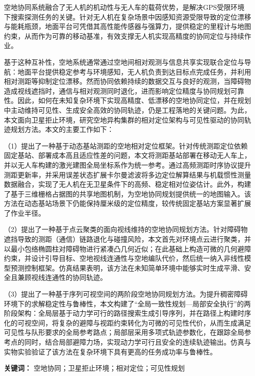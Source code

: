 \cleardoublepage
{}

空地协同系统融合了无人机的机动性与无人车的载荷优势，是解决GPS受限环境下搜索探测任务的关键。针对无人机在复杂场景中因感知资源受限导致的定位漂移与能耗瓶颈，地面平台可凭借其高性能传感器与强算力，提供稳定的里程计与地图约束，从而作为可靠的移动基准，有效支撑无人机实现高精度的协同定位与持续作业。

基于这种互补性，空地系统通常通过空地间相对观测与信息共享实现联合定位与导航：地面平台提供稳定参考与环境感知，无人机负责到达目标点完成任务，并利用相对测距等抑制定位漂移。然而协同依赖持续的数据交互与良好的观测，当障碍物造成视线遮挡时，通信与相对观测同时退化，进而影响定位精度与协同规划可靠性。因此，如何在未知复杂环境下实现高精度、低漂移的空地协同定位，并在规划中主动维持可见性、生成安全高效的协同轨迹，仍是工程落地的关键问题。为此，本文面向卫星拒止环境，研究空地异构集群的相对定位架构与可见性驱动的协同轨迹规划方法。本文的主要工作如下：

（1）提出了一种基于动态基站测距的空地相对定位框架。针对传统测距定位依赖固定基站、部署成本高且适应性差的问题，本文将测距基站部署在移动无人车上，并以无人车构建的激光建图全局坐标系作为统一参考。通过高频测距时序协议提升测距更新率，并采用误差状态扩展卡尔曼滤波将多边定位解算结果与机载惯性测量数据融合，实现了无人机在无卫星条件下的高频、稳定相对位姿估计。此外，构建了基于三维栅格占据图的共享地图机制，为空地协同规划提供统一的地图输入。该方法在动态基站场景下仍能保持厘米级的定位精度，较传统固定基站方案显著扩展了作业半径。

（2）提出了一种基于点云聚类的面向视线维持的空地协同规划方法。针对障碍物遮挡导致的测距（通信）链路退化与碰撞风险，本文首先对环境点云进行聚类，并以最小包络椭圆柱对障碍物进行紧凑凸几何近似；在此基础上构造可微的几何避障约束，并设计引导目标、空地视线连通性与空地编队代价，然后统一纳入非线性模型预测控制框架。仿真结果表明，该方法在未知简单环境中能够实时生成平滑、安全且兼顾视线连通性的协同轨迹。

（3）提出了一种基于序列可视空间的两阶段空地协同规划方法。为提升稠密障碍环境下的求解稳定性与鲁棒性，本文构建了“全局一致性规划—局部安全执行”的两阶段架构：全局层基于动力学可行的路径搜索生成引导序列，并在路径上构建时序化的可视空间，将复杂的避障与视距约束转化为可微的可见性代价，从而生成满足可见性与队形要求的全局参考路点；局部层采用多项式轨迹参数化，在跟踪全局参考点的同时，结合局部避障力场，实现动力学可行且安全的连续轨迹输出。仿真与实物实验验证了该方法在复杂环境下具有更高的任务成功率与鲁棒性。

\vspace{1em}
\noindent \textbf{关键词：} 空地协同；卫星拒止环境；相对定位；可见性规划


